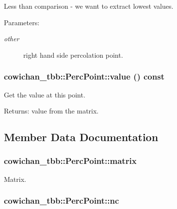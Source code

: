 Less than comparison - we want to extract lowest values. \begin{Desc}
\item[Parameters:]
\begin{description}
\item[{\em other}]right hand side percolation point. \end{description}
\end{Desc}
\hypertarget{classcowichan__tbb_1_1_perc_point_53cad861ab94aac7d92a447b072a61f5}{
\subsubsection[{value}]{ cowichan\_\-tbb::PercPoint::value () const}}
\label{classcowichan__tbb_1_1_perc_point_53cad861ab94aac7d92a447b072a61f5}


Get the value at this point. \begin{Desc}
\item[Returns:]value from the matrix. \end{Desc}


\subsection{Member Data Documentation}
\hypertarget{classcowichan__tbb_1_1_perc_point_66cf1ffa25f7a83d6f36d3fa80148f8e}{
\subsubsection[{matrix}]{ {\bf cowichan\_\-tbb::PercPoint::matrix}}}
\label{classcowichan__tbb_1_1_perc_point_66cf1ffa25f7a83d6f36d3fa80148f8e}


Matrix. \hypertarget{classcowichan__tbb_1_1_perc_point_10b21f3ed373ae36976f42df52992b56}{
\subsubsection[{nc}]{ {\bf cowichan\_\-tbb::PercPoint::nc}}}
\label{classcowichan__tbb_1_1_perc_point_10b21f3ed373ae36976f42df52992b56}


